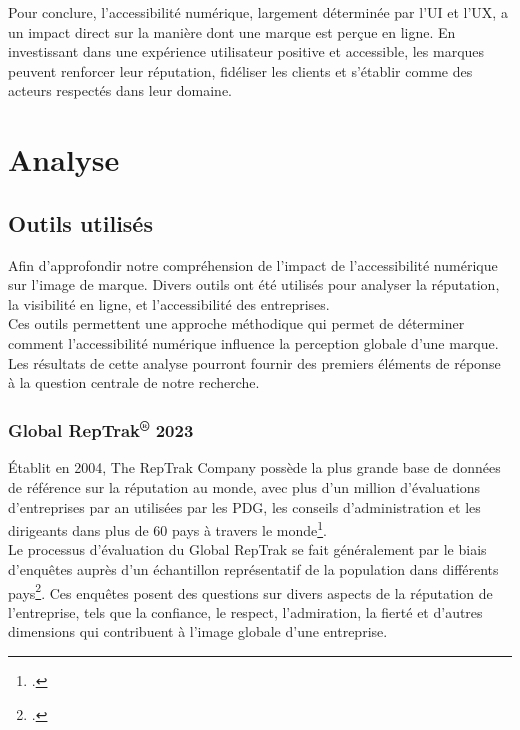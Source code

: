 \documentclass[12pt, a4paper]{report}
\begin{document}
Pour conclure, l'accessibilité numérique, largement déterminée par l'UI et l'UX, a un impact direct sur la manière dont une marque est perçue en ligne. En investissant dans une expérience utilisateur positive et accessible, les marques peuvent renforcer leur réputation, fidéliser les clients et s'établir comme des acteurs respectés dans leur domaine.

\chapter{Analyse}

\section{Outils utilisés}

Afin d'approfondir notre compréhension de l'impact de l'accessibilité numérique sur l'image de marque. Divers outils ont été utilisés pour analyser la réputation, la visibilité en ligne, et l'accessibilité des entreprises.\\

Ces outils permettent une approche méthodique qui permet de déterminer comment l'accessibilité numérique influence la perception globale d'une marque. Les résultats de cette analyse pourront fournir des premiers éléments de réponse à la question centrale de notre recherche.

\subsection{Global RepTrak\textsuperscript{\tiny{®}} 2023}

Établit en 2004, The RepTrak Company possède la plus grande base de données de référence sur la réputation au monde, avec plus d'un million d'évaluations d'entreprises par an utilisées par les PDG, les conseils d'administration et les dirigeants dans plus de 60 pays à travers le monde\footcite{noauthor_reptrak_2023}.\\

Le processus d'évaluation du Global RepTrak se fait généralement par le biais d'enquêtes auprès d'un échantillon représentatif de la population dans différents pays\footcite{noauthor_2023_2023}. Ces enquêtes posent des questions sur divers aspects de la réputation de l'entreprise, tels que la confiance, le respect, l'admiration, la fierté et d'autres dimensions qui contribuent à l'image globale d'une entreprise.\\
\end{document}

